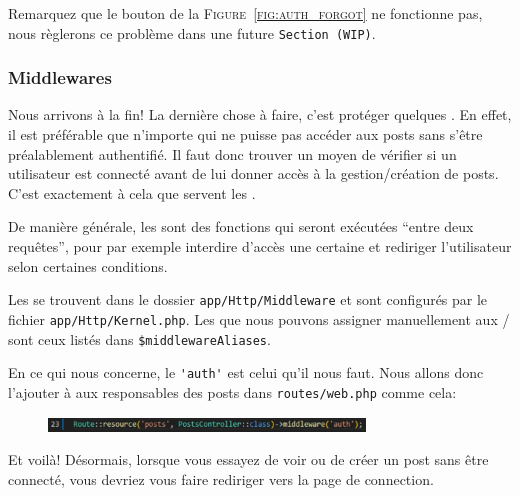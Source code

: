 \newpage

Remarquez que le bouton de la \textsc{Figure~\ref{fig:auth_forgot}} ne fonctionne pas, nous règlerons ce problème dans une future \texttt{Section~(WIP)}.

\subsubsection[Middlewares][laravel.com/docs/10.x/middleware]{Middlewares}

Nous arrivons à la fin! La dernière chose à faire, c'est protéger quelques \routes. En effet, il est préférable que n'importe qui ne puisse pas accéder aux posts sans s'être préalablement authentifié. Il faut donc trouver un moyen de vérifier si un utilisateur est connecté avant de lui donner accès à la gestion/création de posts. C'est exactement à cela que servent les \middlewares{}.

De manière générale, les \middlewares{} sont des fonctions qui seront exécutées ``entre deux requêtes'', pour par exemple interdire d'accès une certaine \route{} et rediriger l'utilisateur selon certaines conditions.

Les \middlewares{} se trouvent dans le dossier \verb|app/Http/Middleware| et sont configurés par le fichier \verb|app/Http/Kernel.php|. Les \middlewares{} que nous pouvons assigner manuellement aux \routes{}/\controllers{} sont ceux listés dans \verb|$middlewareAliases|.

En ce qui nous concerne, le \middleware{} \verb|'auth'| est celui qu'il nous faut. Nous allons donc l'ajouter à aux \routes{} responsables des posts dans \verb|routes/web.php| comme cela:

\begin{figure}[!h]
    \centering
    \includegraphics[width=0.75\textwidth]{figures-C1/middleware_auth.pdf}
    \caption{}
\end{figure}

Et voilà! Désormais, lorsque vous essayez de voir ou de créer un post sans être connecté, vous devriez vous faire rediriger vers la page de connection.

\newpage